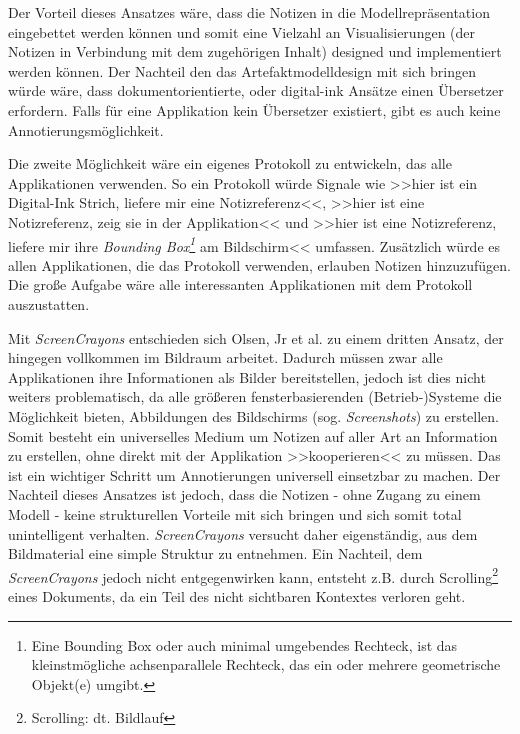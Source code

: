 Der Vorteil dieses Ansatzes wäre, dass die Notizen in die Modellrepräsentation eingebettet werden können und somit eine Vielzahl an Visualisierungen (der Notizen in Verbindung mit dem zugehörigen Inhalt) designed und implementiert werden können. Der Nachteil den das Artefaktmodelldesign mit sich bringen würde wäre, dass dokumentorientierte, oder digital-ink Ansätze einen Übersetzer erfordern. Falls für eine Applikation kein Übersetzer existiert, gibt es auch keine Annotierungsmöglichkeit.

\medskip Die zweite Möglichkeit wäre ein eigenes Protokoll zu entwickeln, das alle Applikationen verwenden. So ein Protokoll würde Signale wie >>hier ist ein Digital-Ink Strich, liefere mir eine Notizreferenz<<, >>hier ist eine Notizreferenz, zeig sie in der Applikation<< und >>hier ist eine Notizreferenz, liefere mir ihre \emph{Bounding Box\footnote{Eine Bounding Box oder auch minimal umgebendes Rechteck, ist das kleinstmögliche achsenparallele Rechteck, das ein oder mehrere geometrische Objekt(e) umgibt.}} am Bildschirm<< umfassen. Zusätzlich würde es allen Applikationen, die das Protokoll verwenden, erlauben Notizen hinzuzufügen. Die große Aufgabe wäre alle interessanten Applikationen mit dem Protokoll auszustatten.

\medskip Mit \emph{ScreenCrayons} entschieden sich Olsen, Jr et al. zu einem dritten Ansatz, der hingegen vollkommen im Bildraum arbeitet. Dadurch müssen zwar alle Applikationen ihre Informationen als Bilder bereitstellen, jedoch ist dies nicht weiters problematisch, da alle größeren fensterbasierenden (Betrieb-)Systeme die Möglichkeit bieten, Abbildungen des Bildschirms (sog. \emph{Screenshots}) zu erstellen.  Somit besteht ein universelles Medium um Notizen auf aller Art an Information zu erstellen, ohne direkt mit der Applikation >>kooperieren<< zu müssen. Das ist ein wichtiger Schritt um Annotierungen universell einsetzbar zu machen. Der Nachteil dieses Ansatzes ist jedoch, dass die Notizen - ohne Zugang zu einem Modell - keine strukturellen Vorteile mit sich bringen und sich somit total unintelligent verhalten. \emph{ScreenCrayons} versucht daher  eigenständig, aus dem Bildmaterial eine simple Struktur zu entnehmen. Ein Nachteil, dem \emph{ScreenCrayons} jedoch nicht entgegenwirken kann, entsteht z.B. durch Scrolling\footnote{Scrolling: dt. Bildlauf} eines Dokuments, da ein Teil des nicht sichtbaren Kontextes verloren geht.

